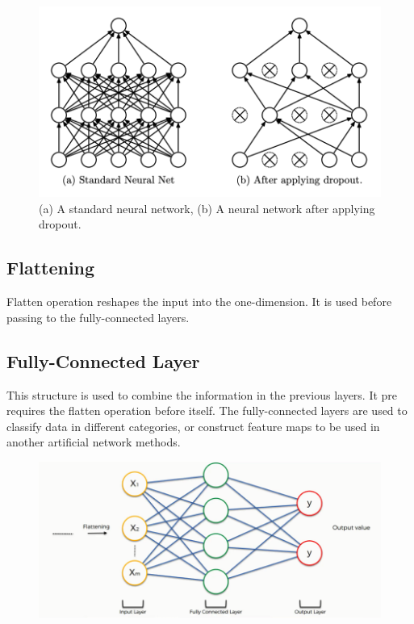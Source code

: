 \begin{figure}[h]
	\centering
	\includegraphics[width=.8\linewidth]{fig/dropout.png}
	\caption{(a) A standard neural network, (b) A neural network after applying dropout\cite{dropout_article}.}
	\label{fig:dropout}
\end{figure}

\subsection{Flattening}

Flatten operation reshapes the input into the one-dimension. It is used before passing to the fully-connected layers.

\subsection{Fully-Connected Layer}

This structure is used to combine the information in the previous layers. It pre requires the flatten operation before itself. The fully-connected layers are used to classify data in different categories, or construct feature maps to be used in another artificial network methods.

\begin{figure}[h]
	\centering
	\includegraphics[width=\linewidth]{fig/fully_connected_layer.png}
	\vspace*{1mm}
	\label{fig:fully_connected_layer}
\end{figure}

